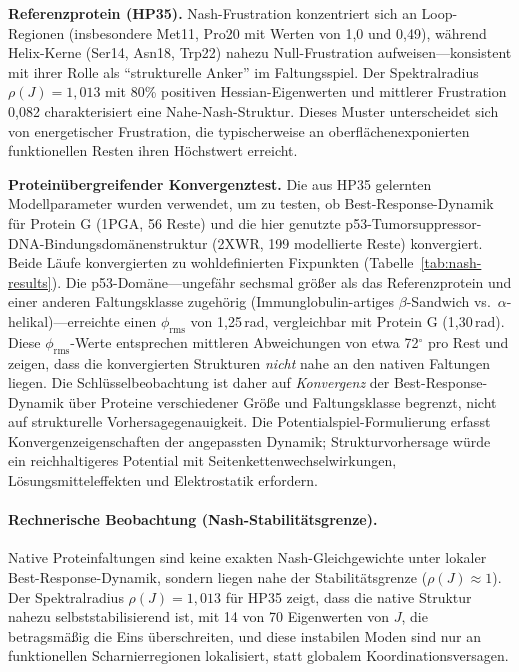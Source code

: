\documentclass[12pt,a4paper]{article}
\theoremstyle{remark}
\begin{document}
\textbf{Referenzprotein (HP35).} Nash-Frustration konzentriert sich an Loop-Regionen (insbesondere Met11, Pro20 mit Werten von 1{,}0 und 0{,}49), während Helix-Kerne (Ser14, Asn18, Trp22) nahezu Null-Frustration aufweisen---konsistent mit ihrer Rolle als ``strukturelle Anker'' im Faltungsspiel. Der Spektralradius $\rho(J) = 1{,}013$ mit 80\% positiven Hessian-Eigenwerten und mittlerer Frustration 0{,}082 charakterisiert eine Nahe-Nash-Struktur. Dieses Muster unterscheidet sich von energetischer Frustration, die typischerweise an oberflächenexponierten funktionellen Resten ihren Höchstwert erreicht.

\textbf{Proteinübergreifender Konvergenztest.} Die aus HP35 gelernten Modellparameter wurden verwendet, um zu testen, ob Best-Response-Dynamik für Protein G (1PGA, 56 Reste) und die hier genutzte p53-Tumorsuppressor-DNA-Bindungsdomänenstruktur (2XWR, 199 modellierte Reste) konvergiert. Beide Läufe konvergierten zu wohldefinierten Fixpunkten (Tabelle~\ref{tab:nash-results}). Die p53-Domäne---ungefähr sechsmal größer als das Referenzprotein und einer anderen Faltungsklasse zugehörig (Immunglobulin-artiges $\beta$-Sandwich vs.\ $\alpha$-helikal)---erreichte einen $\phi_{\text{rms}}$ von 1{,}25\,rad, vergleichbar mit Protein G (1{,}30\,rad). Diese $\phi_{\text{rms}}$-Werte entsprechen mittleren Abweichungen von etwa 72$^\circ$ pro Rest und zeigen, dass die konvergierten Strukturen \emph{nicht} nahe an den nativen Faltungen liegen. Die Schlüsselbeobachtung ist daher auf \emph{Konvergenz} der Best-Response-Dynamik über Proteine verschiedener Größe und Faltungsklasse begrenzt, nicht auf strukturelle Vorhersagegenauigkeit. Die Potentialspiel-Formulierung erfasst Konvergenzeigenschaften der angepassten Dynamik; Strukturvorhersage würde ein reichhaltigeres Potential mit Seitenkettenwechselwirkungen, Lösungsmitteleffekten und Elektrostatik erfordern.

\paragraph{Rechnerische Beobachtung (Nash-Stabilitätsgrenze).}
Native Proteinfaltungen sind keine exakten Nash-Gleichgewichte unter lokaler Best-Response-Dynamik, sondern liegen nahe der Stabilitätsgrenze ($\rho(J) \approx 1$). Der Spektralradius $\rho(J) = 1{,}013$ für HP35 zeigt, dass die native Struktur nahezu selbststabilisierend ist, mit 14 von 70 Eigenwerten von $J$, die betragsmäßig die Eins überschreiten, und diese instabilen Moden sind nur an funktionellen Scharnierregionen lokalisiert, statt globalem Koordinationsversagen.
\end{document}

